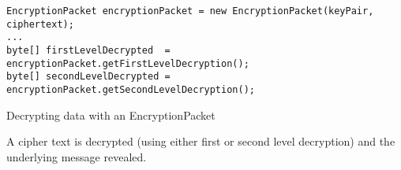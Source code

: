 \begin{listing}[H]
  \centering
  \begin{verbatim}
EncryptionPacket encryptionPacket = new EncryptionPacket(keyPair, ciphertext);
...
byte[] firstLevelDecrypted  = encryptionPacket.getFirstLevelDecryption();
byte[] secondLevelDecrypted = encryptionPacket.getSecondLevelDecryption();
  \end{verbatim}
  \caption{
  	Decrypting data with an EncryptionPacket
  }{
  	A cipher text is decrypted (using either first or second level decryption) and the underlying message revealed.
  }
  \label{code:encryption_packet_decryption}
\end{listing}
